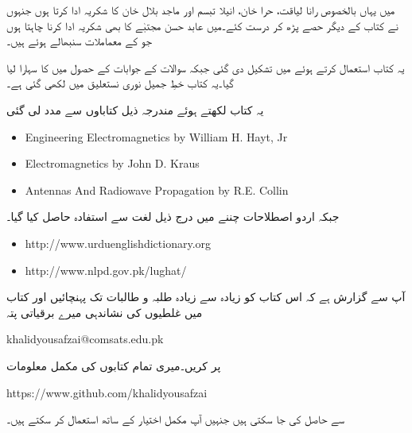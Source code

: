 میں یہاں بالخصوص رانا لیاقت، حرا خان، انیلا تبسم اور ماجد بلال خان کا شکریہ ادا کرتا ہوں جنہوں نے کتاب کے دیگر حصے پڑھ کر درست کئے۔میں عابد حسن مجتبٰے کا بھی شکریہ ادا کرنا چاہتا ہوں جو  کے معماملات سنبھالے ہوئے ہیں۔

یہ کتاب  استعمال کرتے ہوئے  میں تشکیل دی گئی جبکہ سوالات کے جوابات کے حصول میں  کا سہارا لیا گیا۔یہ کتاب خطِ جمیل نوری نستعلیق میں لکھی گئی ہے۔

یہ کتاب لکھتے ہوئے مندرجہ ذیل کتاباوں سے مدد لی گئی
{
\begin{otherlanguage}{english}
\begin{itemize}
\item
Engineering Electromagnetics by William H. Hayt, Jr
\item
Electromagnetics by John D. Kraus
\item
Antennas And Radiowave Propagation by R.E. Collin
\end{itemize}
\end{otherlanguage}
}
جبکہ اردو اصطلاحات چننے میں درج ذیل لغت سے استفادہ حاصل کیا گیا۔
{
\begin{otherlanguage}{english}
\begin{itemize}
\item
http:/\!\!/www.urduenglishdictionary.org
\item
http:/\!\!/www.nlpd.gov.pk/lughat/
\end{itemize}
\end{otherlanguage}
}
آپ سے گزارش ہے کہ اس کتاب کو زیادہ سے زیادہ طلبہ و طالبات تک پہنچائیں اور کتاب میں غلطیوں کی نشاندہی میرے  برقیاتی پتہ

{
\begin{otherlanguage}{english}
khalidyousafzai@comsats.edu.pk
\end{otherlanguage}
}

 پر کریں۔میری تمام کتابوں کی مکمل  معلومات

{
\begin{otherlanguage}{english}
https:/\!\!/www.github.com/khalidyousafzai
\end{otherlanguage}
}

سے حاصل کی جا سکتی ہیں جنہیں آپ مکمل اختیار کے ساتھ استعمال کر سکتے ہیں۔
\vspace{5mm}

{}


